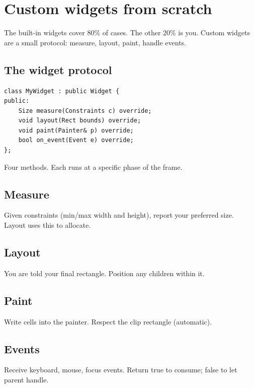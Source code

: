 \chapter{Custom widgets from scratch}
\label{ch:customwidget}

\begin{aside}
The built-in widgets cover 80\% of cases. The other 20\% is
you. Custom widgets are a small protocol: measure, layout,
paint, handle events.
\end{aside}

\section{The widget protocol}

\begin{lstlisting}
class MyWidget : public Widget {
public:
    Size measure(Constraints c) override;
    void layout(Rect bounds) override;
    void paint(Painter& p) override;
    bool on_event(Event e) override;
};
\end{lstlisting}

Four methods. Each runs at a specific phase of the frame.

\section{Measure}

Given constraints (min/max width and height), report your
preferred size. Layout uses this to allocate.

\section{Layout}

You are told your final rectangle. Position any children
within it.

\section{Paint}

Write cells into the painter. Respect the clip rectangle
(automatic).

\section{Events}

Receive keyboard, mouse, focus events. Return true to
consume; false to let parent handle.

